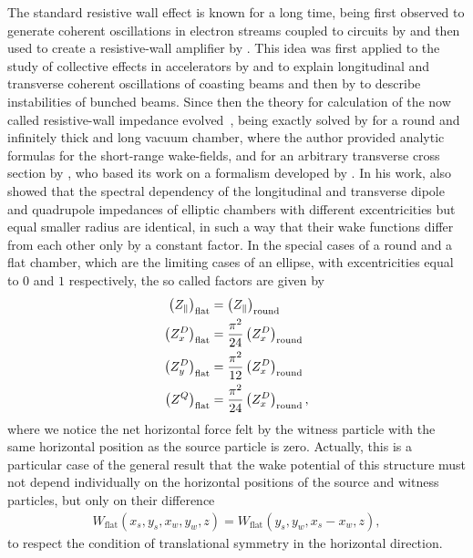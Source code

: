     The standard resistive wall effect is known for a long time, being first observed to generate coherent oscillations in electron streams coupled to circuits by  and then used to create a resistive-wall amplifier by . This idea was first applied to the study of collective effects in accelerators by  and  to explain longitudinal and transverse coherent oscillations of coasting beams and then by  to describe instabilities of bunched beams. Since then the theory for calculation of the now called resistive-wall impedance evolved~\cite{Chao1993}, being exactly solved by  for a round and infinitely thick and long vacuum chamber, where the author provided analytic formulas for the short-range wake-fields, and for an arbitrary transverse cross section by , who based its work on a formalism developed by . In his work, \citeauthor{Yokoya1993} also showed that the spectral dependency of the longitudinal and transverse dipole and quadrupole impedances of elliptic chambers with different excentricities but equal smaller radius are identical, in such a way that their wake functions differ from each other only by a constant factor. In the special cases of a round and a flat chamber, which are the limiting cases of an ellipse, with excentricities equal to $0$ and $1$ respectively, the so called \citeauthor{Yokoya1993} factors are given by
    \begin{align}
        \left(Z_\parallel\right)_\text{flat} &=
                        \left(Z_\parallel\right)_\text{round}\\
        \left(Z_x^D\right)_\text{flat} &= \frac{\pi^2}{24}
                        \left(Z_x^D\right)_\text{round}\\
        \left(Z_y^D\right)_\text{flat} &= \frac{\pi^2}{12}
                        \left(Z_x^D\right)_\text{round}\\
        \left(Z^Q\right)_\text{flat} &= \frac{\pi^2}{24}
                        \left(Z_x^D\right)_\text{round},
    \end{align}
    where we notice the net horizontal force felt by the witness particle with the same horizontal position as the source particle is zero. Actually, this is a particular case of the general result that the wake potential of this structure must not depend individually on the horizontal positions of the source and witness particles, but only on their difference
    \begin{align}\nonumber
        W_\text{flat}(x_s,y_s,x_w,y_w,z)=W_\text{flat}(y_s,y_w,x_s-x_w,z),
    \end{align}
    to respect the condition of translational symmetry in the horizontal direction.

